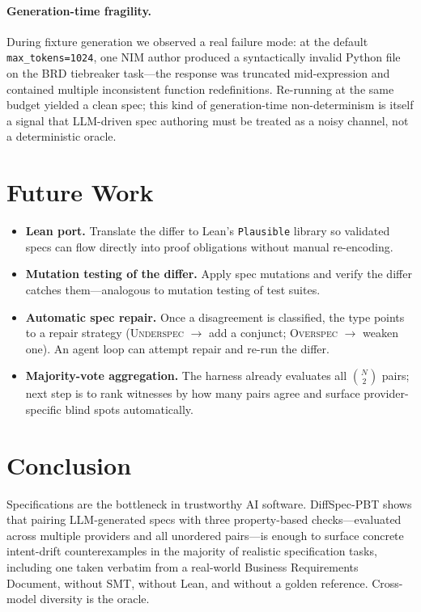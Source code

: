 \documentclass[11pt,a4paper]{article}
\begin{document}
\paragraph{Generation-time fragility.} During fixture generation we
observed a real failure mode: at the default \texttt{max\_tokens=1024},
one NIM author produced a syntactically invalid Python file on the BRD
tiebreaker task—the response was truncated mid-expression and
contained multiple inconsistent function redefinitions. Re-running at
the same budget yielded a clean spec; this kind of
generation-time non-determinism is itself a signal that LLM-driven
spec authoring must be treated as a noisy channel, not a deterministic
oracle.

\section{Future Work}

\begin{itemize}[leftmargin=*]
\item \textbf{Lean port.} Translate the differ to Lean's
\texttt{Plausible} library so validated specs can flow directly into
proof obligations without manual re-encoding.
\item \textbf{Mutation testing of the differ.} Apply spec
mutations and verify the differ catches them—analogous to mutation
testing of test suites.
\item \textbf{Automatic spec repair.} Once a disagreement is
classified, the type points to a repair strategy
(\textsc{Underspec} $\to$ add a conjunct; \textsc{Overspec} $\to$
weaken one). An agent loop can attempt repair and re-run the
differ.
\item \textbf{Majority-vote aggregation.} The harness already evaluates
all $\binom{N}{2}$ pairs; next step is to rank witnesses by how many
pairs agree and surface provider-specific blind spots automatically.
\end{itemize}

\section{Conclusion}

Specifications are the bottleneck in trustworthy AI software.
DiffSpec-PBT shows that pairing LLM-generated specs with three
property-based checks—evaluated across multiple providers and all
unordered pairs—is enough to surface concrete intent-drift
counterexamples in the majority of realistic specification tasks,
including one taken verbatim from a real-world Business Requirements
Document, without SMT, without Lean, and without a golden reference.
Cross-model diversity is the oracle.
\end{document}
